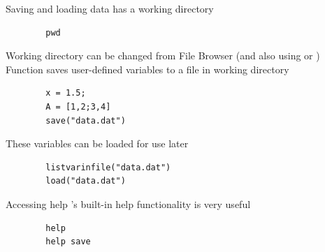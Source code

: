 \begin{frame}[fragile]{Saving and loading data}
    \scilab{} has a working directory
    \begin{lstlisting}
        pwd
    \end{lstlisting}
    Working directory can be changed from File Browser (and also using  or )\\[0.5em]
    Function  saves user-defined variables to a file in working directory
    \begin{lstlisting}
        x = 1.5;
        A = [1,2;3,4]
        save("data.dat")
    \end{lstlisting}
    These variables can be loaded for use later
    \begin{lstlisting}
        listvarinfile("data.dat")
        load("data.dat")
    \end{lstlisting}
\end{frame}

\begin{frame}[fragile]{Accessing help}
    \scilab's built-in help functionality is very useful
    \begin{lstlisting}
        help
        help save
    \end{lstlisting}
\end{frame}

